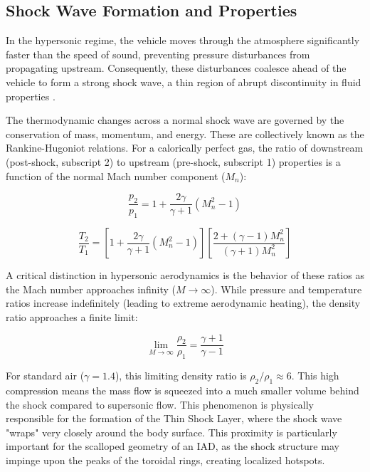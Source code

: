 \subsection{Shock Wave Formation and Properties}


In the hypersonic regime, the vehicle moves through the atmosphere significantly faster than the speed of sound, preventing pressure disturbances from propagating upstream. Consequently, these disturbances coalesce ahead of the vehicle to form a strong shock wave, a thin region of abrupt discontinuity in fluid properties \cite{AndersonHypersonic}.
\par
The thermodynamic changes across a normal shock wave are governed by the conservation of mass, momentum, and energy. These are collectively known as the Rankine-Hugoniot relations. For a calorically perfect gas, the ratio of downstream (post-shock, subscript 2) to upstream (pre-shock, subscript 1) properties is a function of the normal Mach number component ($M_n$):
\par
\begin{equation}
    \frac{p_2}{p_1} = 1 + \frac{2\gamma}{\gamma + 1} (M_n^2 - 1)
\end{equation}

\begin{equation}
    \frac{T_2}{T_1} = \left[1 + \frac{2\gamma}{\gamma + 1} (M_n^2 - 1)\right] \left[ \frac{2 + (\gamma - 1)M_n^2}{(\gamma + 1)M_n^2} \right]
\end{equation}

A critical distinction in hypersonic aerodynamics is the behavior of these ratios as the Mach number approaches infinity ($M \to \infty$). While pressure and temperature ratios increase indefinitely (leading to extreme aerodynamic heating), the density ratio approaches a finite limit:

\begin{equation}
    \lim_{M \to \infty} \frac{\rho_2}{\rho_1} = \frac{\gamma + 1}{\gamma - 1}
\end{equation}

For standard air ($\gamma = 1.4$), this limiting density ratio is $\rho_2/\rho_1 \approx 6$. This high compression means the mass flow is squeezed into a much smaller volume behind the shock compared to supersonic flow. This phenomenon is physically responsible for the formation of the Thin Shock Layer, where the shock wave "wraps" very closely around the body surface. This proximity is particularly important for the scalloped geometry of an IAD, as the shock structure may impinge upon the peaks of the toroidal rings, creating localized hotspots.

